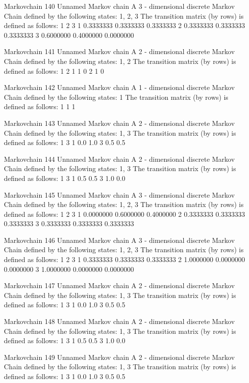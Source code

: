 \documentclass[
  nojss]{jss}
\begin{document}
\begin{CodeChunk}
\begin{CodeOutput}
Markovchain  140 
Unnamed Markov chain 
 A  3 - dimensional discrete Markov Chain defined by the following states: 
 1, 2, 3 
 The transition matrix  (by rows)  is defined as follows: 
          1         2         3
1 0.3333333 0.3333333 0.3333333
2 0.3333333 0.3333333 0.3333333
3 0.6000000 0.4000000 0.0000000

Markovchain  141 
Unnamed Markov chain 
 A  2 - dimensional discrete Markov Chain defined by the following states: 
 1, 2 
 The transition matrix  (by rows)  is defined as follows: 
  1 2
1 1 0
2 1 0

Markovchain  142 
Unnamed Markov chain 
 A  1 - dimensional discrete Markov Chain defined by the following states: 
 1 
 The transition matrix  (by rows)  is defined as follows: 
  1
1 1

Markovchain  143 
Unnamed Markov chain 
 A  2 - dimensional discrete Markov Chain defined by the following states: 
 1, 3 
 The transition matrix  (by rows)  is defined as follows: 
    1   3
1 0.0 1.0
3 0.5 0.5

Markovchain  144 
Unnamed Markov chain 
 A  2 - dimensional discrete Markov Chain defined by the following states: 
 1, 3 
 The transition matrix  (by rows)  is defined as follows: 
    1   3
1 0.5 0.5
3 1.0 0.0

Markovchain  145 
Unnamed Markov chain 
 A  3 - dimensional discrete Markov Chain defined by the following states: 
 1, 2, 3 
 The transition matrix  (by rows)  is defined as follows: 
          1         2         3
1 0.0000000 0.6000000 0.4000000
2 0.3333333 0.3333333 0.3333333
3 0.3333333 0.3333333 0.3333333

Markovchain  146 
Unnamed Markov chain 
 A  3 - dimensional discrete Markov Chain defined by the following states: 
 1, 2, 3 
 The transition matrix  (by rows)  is defined as follows: 
          1         2         3
1 0.3333333 0.3333333 0.3333333
2 1.0000000 0.0000000 0.0000000
3 1.0000000 0.0000000 0.0000000

Markovchain  147 
Unnamed Markov chain 
 A  2 - dimensional discrete Markov Chain defined by the following states: 
 1, 3 
 The transition matrix  (by rows)  is defined as follows: 
    1   3
1 0.0 1.0
3 0.5 0.5

Markovchain  148 
Unnamed Markov chain 
 A  2 - dimensional discrete Markov Chain defined by the following states: 
 1, 3 
 The transition matrix  (by rows)  is defined as follows: 
    1   3
1 0.5 0.5
3 1.0 0.0

Markovchain  149 
Unnamed Markov chain 
 A  2 - dimensional discrete Markov Chain defined by the following states: 
 1, 3 
 The transition matrix  (by rows)  is defined as follows: 
    1   3
1 0.0 1.0
3 0.5 0.5


\end{CodeOutput}
\end{CodeChunk}
\end{document}
